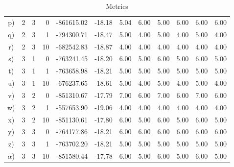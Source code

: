 \documentclass[10pt]{article} %
\begin{document}
\begin{table}[H]
\begin{tabular}{crrrrrrrrrrr}
  \hline                                           
  p) &2 &3 & 0 & -861615.02 & -18.18 & 5.04 & 6.00 & 5.00 & 6.00 & 6.00 & 6.00 \\
  q) &2 &3 & 1 & -794300.71 & -18.47 & 5.00 & 4.00 & 5.00 & 4.00 & 5.00 & 4.00 \\
  r) &2 &3 &10 & -682542.83 & -18.87 & 4.00 & 4.00 & 4.00 & 4.00 & 4.00 & 4.00 \\
  \hline\hline                                     
  s) &3 &1 & 0 & -763241.45 & -18.20 & 6.00 & 5.00 & 6.00 & 5.00 & 6.00 & 5.00 \\
  t) &3 &1 & 1 & -763658.98 & -18.21 & 5.00 & 5.00 & 5.00 & 5.00 & 5.00 & 5.00 \\
  u) &3 &1 &10 & -676237.65 & -18.61 & 5.00 & 4.00 & 5.00 & 4.00 & 5.00 & 4.00 \\
  \hline                                           
  v) &3 &2 & 0 & -851310.67 & -17.79 & 7.00 & 6.00 & 7.00 & 6.00 & 7.00 & 6.00 \\
  w) &3 &2 & 1 & -557653.90 & -19.06 & 4.00 & 4.00 & 4.00 & 4.00 & 4.00 & 4.00 \\
  x) &3 &2 &10 & -851130.61 & -17.80 & 6.00 & 5.00 & 6.00 & 5.00 & 6.00 & 5.00 \\
  \hline                                           
  y) &3 &3 & 0 & -764177.86 & -18.21 & 6.00 & 6.00 & 6.00 & 6.00 & 6.00 & 6.00 \\
  z) &3 &3 & 1 & -763702.20 & -18.21 & 5.00 & 5.00 & 5.00 & 5.00 & 5.00 & 5.00 \\
  $\alpha$) &3 &3 &10 & -851580.44 & -17.78 & 6.00 & 5.00 & 6.00 & 5.00 & 6.00 & 5.00 \\
  \hline
\end{tabular}
\caption{Metrics}
\label{tab:metrics}
\end{table}


% 
\end{document}

